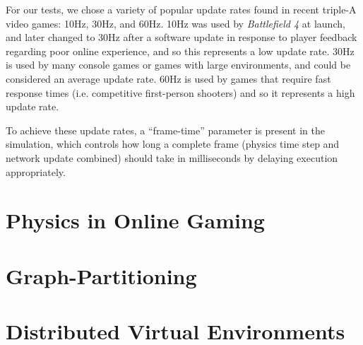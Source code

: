 For our tests, we chose a variety of popular update rates found in recent triple-A video games: 10Hz, 30Hz, and 60Hz. 10Hz was used by \textit{Battlefield 4} at launch, and later changed to 30Hz after a software update in response to player feedback regarding poor online experience, and so this represents a low update rate. 30Hz is used by many console games or games with large environments, and could be considered an average update rate. 60Hz is used by games that require fast response times (i.e. competitive first-person shooters) and so it represents a high update rate.

To achieve these update rates, a ``frame-time'' parameter is present in the simulation, which controls how long a complete frame (physics time step and network update combined) should take in milliseconds by delaying execution appropriately.

\section{Physics in Online Gaming}

\section{Graph-Partitioning}

\section{Distributed Virtual Environments}

